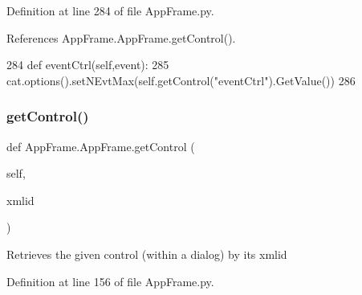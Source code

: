 Definition at line 284 of file App\+Frame.\+py.



References App\+Frame.\+App\+Frame.\+get\+Control().


\begin{DoxyCode}
284     \textcolor{keyword}{def }eventCtrl(self,event):
285         cat.options().setNEvtMax(self.getControl(\textcolor{stringliteral}{"eventCtrl"}).GetValue()) 
286 
\end{DoxyCode}
\mbox{\label{classAppFrame_1_1AppFrame_aec012d3022e406db34659adb07ef792a}} 
\subsubsection{\texorpdfstring{get\+Control()}{getControl()}}
{\footnotesize\ttfamily def App\+Frame.\+App\+Frame.\+get\+Control (\begin{DoxyParamCaption}\item[{}]{self,  }\item[{}]{xmlid }\end{DoxyParamCaption})}

\begin{DoxyVerb}Retrieves the given control (within a dialog) by its xmlid\end{DoxyVerb}
 

Definition at line 156 of file App\+Frame.\+py.



